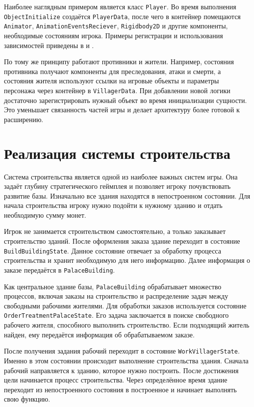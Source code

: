 \documentclass[a4paper,12pt]{report}
\begin{document}
Наиболее наглядным примером является класс \texttt{Player}. Во время выполнения \texttt{ObjectInitialize} создаётся \texttt{PlayerData}, после чего в контейнер помещаются \texttt{Animator}, \texttt{AnimationEventsReciever}, \texttt{Rigidbody2D} и другие компоненты, необходимые состояниям игрока. Примеры регистрации и использования зависимостей приведены в  и .

По тому же принципу работают противники и жители. Например, состояния противника получают компоненты для преследования, атаки и смерти, а состояния жителя используют ссылки на игровые объекты и параметры персонажа через контейнер в \texttt{VillagerData}. При добавлении новой логики достаточно зарегистрировать нужный объект во время инициализации сущности. Это уменьшает связанность частей игры и делает архитектуру более готовой к расширению.

\section{Реализация системы строительства}

Система строительства является одной из наиболее важных систем игры. Она задаёт глубину стратегического геймплея и позволяет игроку почувствовать развитие базы. Изначально все здания находятся в непостроенном состоянии. Для начала строительства игроку нужно подойти к нужному зданию и отдать необходимую сумму монет.

Игрок не занимается строительством самостоятельно, а только заказывает строительство зданий. После оформления заказа здание переходит в состояние \texttt{BuildBuildingState}. Данное состояние отвечает за обработку процесса строительства и хранит необходимую для него информацию. Далее информация о заказе передаётся в \texttt{PalaceBuilding}.

Как центральное здание базы, \texttt{PalaceBuilding} обрабатывает множество процессов, включая заказы на строительство и распределение задач между свободными рабочими жителями. Для обработки заказов используется состояние \texttt{OrderTreatmentPalaceState}. Его задача заключается в поиске свободного рабочего жителя, способного выполнить строительство. Если подходящий житель найден, ему передаётся информация об обрабатываемом заказе.

После получения задания рабочий переходит в состояние \texttt{WorkVillagerState}. Именно в этом состоянии происходит выполнение строительства здания. Сначала рабочий направляется к зданию, которое нужно построить. После достижения цели начинается процесс строительства. Через определённое время здание переходит из непостроенного состояния в построенное и начинает выполнять свою функцию.
\end{document}
